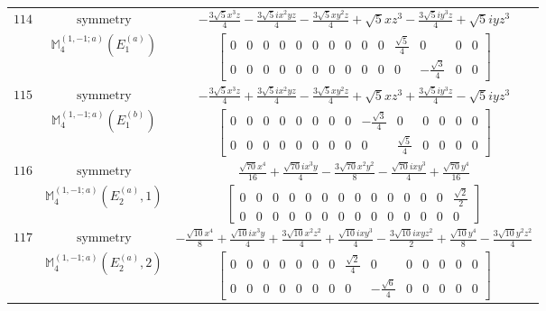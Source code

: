 \documentclass[fleqn,8pt,landscape]{jsarticle}
\begin{document}
\begin{longtable}{ccc}
$ 114 $ & $ \text{symmetry} $ & $ - \frac{3 \sqrt{5} x^{3} z}{4} - \frac{3 \sqrt{5} i x^{2} y z}{4} - \frac{3 \sqrt{5} x y^{2} z}{4} + \sqrt{5} x z^{3} - \frac{3 \sqrt{5} i y^{3} z}{4} + \sqrt{5} i y z^{3} $ \\
$  $ & $ \mathbb{M}_{4}^{(1,-1;a)}(E_{1}^{(a)}) $ & $ \begin{bmatrix} 0 & 0 & 0 & 0 & 0 & 0 & 0 & 0 & 0 & 0 & \frac{\sqrt{5}}{4} & 0 & 0 & 0 \\ 0 & 0 & 0 & 0 & 0 & 0 & 0 & 0 & 0 & 0 & 0 & - \frac{\sqrt{3}}{4} & 0 & 0 \end{bmatrix} $ \\ \hline
$ 115 $ & $ \text{symmetry} $ & $ - \frac{3 \sqrt{5} x^{3} z}{4} + \frac{3 \sqrt{5} i x^{2} y z}{4} - \frac{3 \sqrt{5} x y^{2} z}{4} + \sqrt{5} x z^{3} + \frac{3 \sqrt{5} i y^{3} z}{4} - \sqrt{5} i y z^{3} $ \\
$  $ & $ \mathbb{M}_{4}^{(1,-1;a)}(E_{1}^{(b)}) $ & $ \begin{bmatrix} 0 & 0 & 0 & 0 & 0 & 0 & 0 & 0 & - \frac{\sqrt{3}}{4} & 0 & 0 & 0 & 0 & 0 \\ 0 & 0 & 0 & 0 & 0 & 0 & 0 & 0 & 0 & \frac{\sqrt{5}}{4} & 0 & 0 & 0 & 0 \end{bmatrix} $ \\ \hline
$ 116 $ & $ \text{symmetry} $ & $ \frac{\sqrt{70} x^{4}}{16} + \frac{\sqrt{70} i x^{3} y}{4} - \frac{3 \sqrt{70} x^{2} y^{2}}{8} - \frac{\sqrt{70} i x y^{3}}{4} + \frac{\sqrt{70} y^{4}}{16} $ \\
$  $ & $ \mathbb{M}_{4}^{(1,-1;a)}(E_{2}^{(a)},1) $ & $ \begin{bmatrix} 0 & 0 & 0 & 0 & 0 & 0 & 0 & 0 & 0 & 0 & 0 & 0 & 0 & \frac{\sqrt{2}}{2} \\ 0 & 0 & 0 & 0 & 0 & 0 & 0 & 0 & 0 & 0 & 0 & 0 & 0 & 0 \end{bmatrix} $ \\ \hline
$ 117 $ & $ \text{symmetry} $ & $ - \frac{\sqrt{10} x^{4}}{8} + \frac{\sqrt{10} i x^{3} y}{4} + \frac{3 \sqrt{10} x^{2} z^{2}}{4} + \frac{\sqrt{10} i x y^{3}}{4} - \frac{3 \sqrt{10} i x y z^{2}}{2} + \frac{\sqrt{10} y^{4}}{8} - \frac{3 \sqrt{10} y^{2} z^{2}}{4} $ \\
$  $ & $ \mathbb{M}_{4}^{(1,-1;a)}(E_{2}^{(a)},2) $ & $ \begin{bmatrix} 0 & 0 & 0 & 0 & 0 & 0 & 0 & \frac{\sqrt{2}}{4} & 0 & 0 & 0 & 0 & 0 & 0 \\ 0 & 0 & 0 & 0 & 0 & 0 & 0 & 0 & - \frac{\sqrt{6}}{4} & 0 & 0 & 0 & 0 & 0 \end{bmatrix} $ \\ \hline

\end{longtable}
\end{document}

